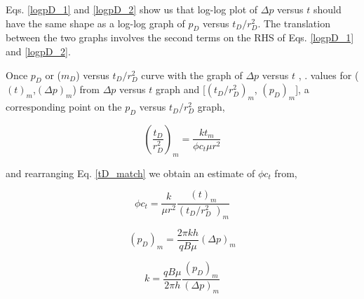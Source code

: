 \documentclass{llncs}
\numberwithin{equation}{section}
\numberwithin{figure}{section}
\numberwithin{table}{section}
\begin{document}
    Eqs. \ref{logpD_1} and \ref{logpD_2} show us that log-log plot of $\Delta p$ versus $t$ should have the same shape as a log-log graph of $p_{D}$ versus $t_{D}/r_{D}^{2}$. The translation between the two graphs involves the second terms on the RHS of Eqs. \ref{logpD_1} and \ref{logpD_2}.

    Once  $p_{D}$ or ($m_{D}$) versus $t_{D}/r_{D}^{2}$ curve with the graph of $\Delta p$ versus $t$ , .  values for ($(t)_{m}$,$(\Delta p)_{m}$) from $\Delta p$ versus $t$ graph and  [$(t_{D}/r_{D}^{2})_{m}$, $(p_{D})_{m}$], a corresponding point on the $p_{D}$ versus $t_{D}/r_{D}^{2}$ graph,

    \begin{equation}
    {{\left( \frac{{{t}_{D}}}{r_{D}^{2}} \right)}_{m}}=\frac{k{{t}_{m}}}{\phi {{c}_{t}}\mu {{r}^{2}}}
        \label{tD_match}
    \end{equation}

    and rearranging Eq. \ref{tD_match} we  obtain an estimate of $\phi {{c}_{t}}$ from,

    \begin{equation}
    \phi {{c}_{t}}=\frac{k}{\mu {{r}^{2}}}\frac{{{\left( t \right)}_{m}}}{{{\left( {{{t}_{D}}}/{r_{D}^{2}}\; \right)}_{m}}}
        \label{phct_match}
    \end{equation}


    \begin{equation}
    {{\left( {{p}_{D}} \right)}_{m}}=\frac{2\pi kh}{qB\mu }{{\left( \Delta p \right)}_{m}}
        \label{k_match_1}
    \end{equation}

    \begin{equation}
    k=\frac{qB\mu }{2\pi h}\frac{{{\left( {{p}_{D}} \right)}_{m}}}{{{\left( \Delta p \right)}_{m}}}
        \label{k_match_2}
    \end{equation}
\end{document}
